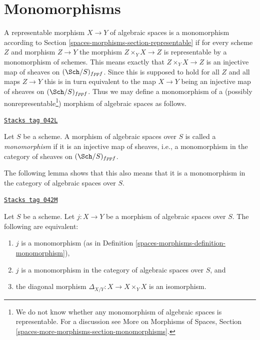 \section{Monomorphisms}
\label{spaces-morphisms-section-monomorphisms}
A representable morphism $X \to Y$ of algebraic spaces is a monomorphism
according to Section \ref{spaces-morphisms-section-representable} if for every scheme
$Z$ and morphism $Z \to Y$ the morphism $Z \times_Y X \to Z$
is representable by a monomorphism of schemes.
This means exactly that $Z \times_Y X \to Z$
is an injective map of sheaves on $(\Sch/S)_{fppf}$. Since this
is supposed to hold for all $Z$ and all maps $Z \to Y$ this is in turn
equivalent to the map $X \to Y$ being an injective map of sheaves on
$(\Sch/S)_{fppf}$. Thus we may define a monomorphism of a (possibly
nonrepresentable\footnote{We do not know whether any monomorphism
of algebraic spaces is representable. For a discussion see
More on Morphisms of Spaces, Section
\ref{spaces-more-morphisms-section-monomorphisms}.})
morphism of algebraic spaces as follows.

\begin{definition}[Monomorphism]
\label{spaces-morphisms-definition-monomorphism}
\href{https://stacks.math.columbia.edu/tag/042L}{\texttt{Stacks tag 042L}}

Let $S$ be a scheme.
A morphism of algebraic spaces over $S$ is called a {\it monomorphism}
if it is an injective map of sheaves, i.e., a monomorphism in the category
of sheaves on $(\Sch/S)_{fppf}$.
\end{definition}

The following lemma shows that this also means that it is a monomorphism
in the category of algebraic spaces over $S$.

\begin{lemma}[Monomorphism]
\label{spaces-morphisms-lemma-monomorphism}
\href{https://stacks.math.columbia.edu/tag/042M}{\texttt{Stacks tag 042M}}

Let $S$ be a scheme.
Let $j : X \to Y$ be a morphism of algebraic spaces over $S$.
The following are equivalent:
\begin{enumerate}
\item $j$ is a monomorphism (as in Definition \ref{spaces-morphisms-definition-monomorphism}),
\item $j$ is a monomorphism in the category of algebraic spaces over $S$, and
\item the diagonal morphism $\Delta_{X/Y} : X \to X \times_Y X$ is
an isomorphism.
\end{enumerate}
\end{lemma}

